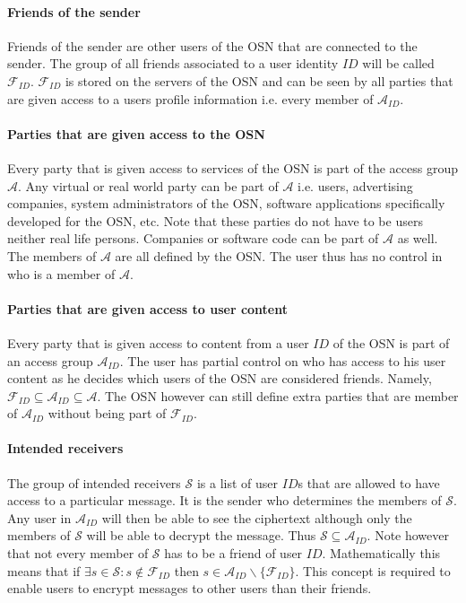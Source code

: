 \documentclass[12pt,openany]{article}
\begin{document}
\paragraph{Friends of the sender} Friends of the sender are other users of the
OSN that are connected to the sender. The group of all friends associated to a
user identity $ID$ will be called $\mathcal{F}_{ID}$. $\mathcal{F}_{ID}$ is
stored on the servers of the OSN and can be seen by all parties that are given
access to a users profile information i.e. every member of $\mathcal{A}_{ID}$.

\paragraph{Parties that are given access to the OSN} Every party that is given
access to services of the OSN is part of the access group $\mathcal{A}$. Any
virtual or real world party can be part of $\mathcal{A}$ i.e. users, advertising
companies, system administrators of the OSN, software applications specifically
developed for the OSN, etc. Note that these parties do not have to be users
neither real life persons. Companies or software code can be part of
$\mathcal{A}$ as well. The members of $\mathcal{A}$ are all defined by the
OSN. The user thus has no control in who is a member of $\mathcal{A}$.

\paragraph{Parties that are given access to user content} Every party that is
given access to content from a user $ID$ of the OSN is part of an access group
$\mathcal{A}_{ID}$. The user has partial control on who has access to his user
content as he decides which users of the OSN are considered friends. Namely,
$\mathcal{F}_{ID} \subseteq \mathcal{A}_{ID} \subseteq \mathcal{A}$. The OSN
however can still define extra parties that are member of $\mathcal{A}_{ID}$
without being part of $\mathcal{F}_{ID}$.

\paragraph{Intended receivers} The group of intended receivers $\mathcal{S}$ is
a list of user $ID$s that are allowed to have access to a particular message.
It is the sender who determines the members of $\mathcal{S}$. Any user in
$\mathcal{A}_{ID}$ will then be able to see the ciphertext although only the
members of $\mathcal{S}$ will be able to decrypt the message. Thus
$\mathcal{S} \subseteq \mathcal{A}_{ID}$. Note however that not every member of
$\mathcal{S}$ has to be a friend of user $ID$. Mathematically this means that
if $\exists s \in \mathcal{S} : s \notin \mathcal{F}_{ID}$ then $s \in
\mathcal{A}_{ID} \backslash \{ \mathcal{F}_{ID} \}$. This concept is required to
enable users to encrypt messages to other users than their friends.
\end{document}
